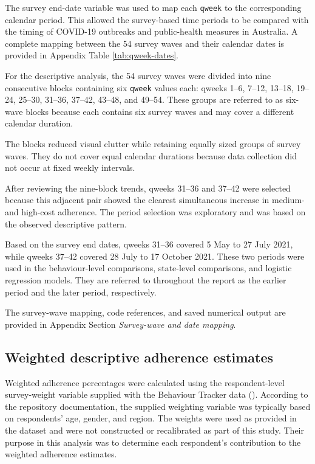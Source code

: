 \documentclass[
  12pt,
  a4paper,
]{article}
\begin{document}
The survey end-date variable was used to map each \texttt{qweek} to the
corresponding calendar period. This allowed the survey-based time
periods to be compared with the timing of COVID-19 outbreaks and
public-health measures in Australia. A complete mapping between the 54
survey waves and their calendar dates is provided in Appendix Table
\ref{tab:qweek-dates}.

For the descriptive analysis, the 54 survey waves were divided into nine
consecutive blocks containing six \texttt{qweek} values each: qweeks 1--6,
7--12, 13--18, 19--24, 25--30, 31--36, 37--42, 43--48, and 49--54. These
groups are referred to as six-wave blocks because each contains six
survey waves and may cover a different calendar duration.

The blocks reduced visual clutter while retaining equally sized groups
of survey waves. They do not cover equal calendar durations because data
collection did not occur at fixed weekly intervals.

After reviewing the nine-block trends, qweeks 31--36 and 37--42 were
selected because this adjacent pair showed the clearest simultaneous
increase in medium- and high-cost adherence. The period selection was
exploratory and was based on the observed descriptive pattern.

Based on the survey end dates, qweeks 31--36 covered 5 May to 27 July
2021, while qweeks 37--42 covered 28 July to 17 October 2021. These two
periods were used in the behaviour-level comparisons, state-level
comparisons, and logistic regression models. They are referred to
throughout the report as the earlier period and the later period,
respectively.

The survey-wave mapping, code references, and saved numerical output are
provided in Appendix Section \emph{Survey-wave and date mapping}.

\subsection{Weighted descriptive adherence estimates}\label{weighted-descriptive-adherence-estimates}

Weighted adherence percentages were calculated using the
respondent-level survey-weight variable supplied with the Behaviour
Tracker data (). According to the repository documentation,
the supplied weighting variable was typically based on respondents' age,
gender, and region. The weights were used as provided in the dataset and
were not constructed or recalibrated as part of this study. Their
purpose in this analysis was to determine each respondent's contribution
to the weighted adherence estimates.
\end{document}
